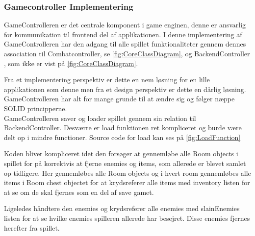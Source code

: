 \subsubsection{Gamecontroller Implementering}

\noindent GameControlleren er det centrale komponent i game enginen, denne er ansvarlig 
for kommunikation til frontend del af applikationen. I denne implementering af 
GameControlleren har den adgang til alle spillet funktionaliteter gennem dennes
association til Combatcontroller, se \autoref{fig:CoreClassDiagram}, og BackendController
, som ikke er vist på \autoref{fig:CoreClassDiagram}.

Fra et implementering perspektiv er dette en nem løsning for en lille applikationen som denne
men fra et design perspektiv er dette en dårlig løsning. GameControlleren har alt for mange
grunde til at ændre sig og følger næppe SOLID principperne. \\

GameControlleren saver og loader spillet gennem sin relation til BackendController. 
Desværre er load funktionen ret kompliceret og burde være delt op i mindre functioner.
Source code for load kan ses på \autoref{fig:LoadFunction}

Koden bliver kompliceret idet den forsøger at gennemløbe alle Room objects i spillet
for på korrektvis at fjerne enemies og items, som allerede er blevet samlet op tidligere.
Her gennemløbes alle Room objects og i hvert room gennemløbes alle items i Room chest
objectet for at krydsreferer alle items med inventory listen for at se om de skal fjernes
som en del af save gamet.

Ligeledes håndtere den enemies og krydsreferer alle enemies med slainEnemies listen for at
se hvilke enemies spilleren allerede har besejret. Disse enemies fjernes herefter fra spillet.

